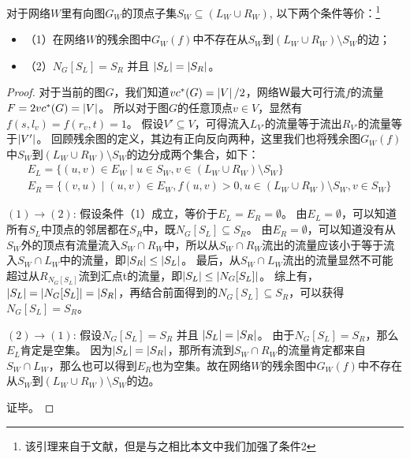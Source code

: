 \begin{lemma}  \label{residualgraph1}
对于网络$W$里有向图$G_W$的顶点子集$S_W \subseteq (L_W \cup R_W)$, 以下两个条件等价：\footnote{该引理来自于文献\cite{iwata2014linear}，但是与之相比本文中我们加强了条件2}
\begin{itemize}
  \item {（1）}在网络$W$的残余图中$G_W(f)$中不存在从$S_W$到$(L_W \cup R_W) \setminus S_W$的边；
  \item {（2）}$N_G[S_L] = S_R$ 并且 $\left\vert S_L \right\vert = \left\vert S_R \right\vert$。
\end{itemize}
\end{lemma}
\begin{proof}
  对于当前的图$G$，我们知道$vc^*(G) = \left\vert V \right\vert / 2$，网络Ｗ最大可行流$f$的流量$F=2vc^*(G)=\left\vert V \right\vert$。
  所以对于图$G$的任意顶点$v \in V$，显然有$f(s, l_v) = f(r_v, t) = 1$。
  假设$V' \subseteq V$，可得流入$L_{V'}$的流量等于流出$R_{V'}$的流量等于$\left\vert V' \right\vert$。
  回顾残余图的定义，其边有正向反向两种，这里我们也将残余图$G_W(f)$中$S_W$到$(L_W \cup R_W) \setminus S_W$的边分成两个集合，如下：
  \begin{equation*} \begin{aligned}
    & E_L = \{(u, v) \in E_W\;|\;u \in S_W,v \in (L_W \cup R_W) \setminus S_W\} \\
    & E_R = \{(v, u)\;|\;(u, v) \in E_W,f(u, v) > 0,u \in (L_W \cup R_W) \setminus S_W,v \in S_W\}
  \end{aligned} \end{equation*}


  $(1)\rightarrow (2)$: 假设条件（1）成立，等价于$E_L = E_R = \emptyset$。
  由$E_L = \emptyset$，可以知道所有$S_L$中顶点的邻居都在$S_R$中，既$N_G[S_L] \subseteq S_R$。
  由$E_R = \emptyset$，可以知道没有从$S_W$外的顶点有流量流入$S_W \cap R_W$中，所以从$S_W \cap R_W$流出的流量应该小于等于流入$S_W \cap L_W$中的流量，即$\left\vert S_R \right\vert \le \left\vert S_L \right\vert$。
  最后，从$S_W \cap L_W$流出的流量显然不可能超过从$R_{N_G[S_L]}$流到汇点t的流量，即$\left\vert S_L \right\vert \le \left\vert N_G[S_L] \right\vert$。
  综上有，$\left\vert S_L \right\vert = \left\vert N_G[S_L] \right\vert = \left\vert S_R \right\vert$，再结合前面得到的$N_G[S_L] \subseteq S_R$，可以获得$N_G[S_L] = S_R$。

  $(2)\rightarrow (1)$: 假设$N_G[S_L] = S_R$ 并且 $\left\vert S_L \right\vert = \left\vert S_R \right\vert$。
  由于$N_G[S_L] = S_R$，那么$E_L$肯定是空集。
  因为$\left\vert S_L \right\vert = \left\vert S_R \right\vert$，那所有流到$S_W \cap R_W$的流量肯定都来自$S_W \cap L_W$，那么也可以得到$E_R$也为空集。故在网络$W$的残余图中$G_W(f)$中不存在从$S_W$到$(L_W \cup R_W) \setminus S_W$的边。

  证毕。
\end{proof}

